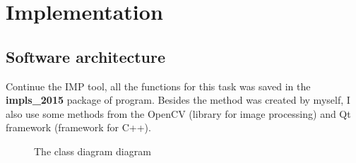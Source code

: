  \chapter{Implementation}
\section{Software architecture}
Continue the IMP tool, all the functions for this task was saved in the \textbf{impls\_2015} package of program. Besides the method was created by myself, I also use some methods from the OpenCV (library for image processing) and Qt framework (framework for C++).\\[0.2cm]
\begin{figure}[p]
    \vspace*{-3cm}
    \caption{The class diagram diagram}
    \label{fig:cdiagram}
\end{figure}
